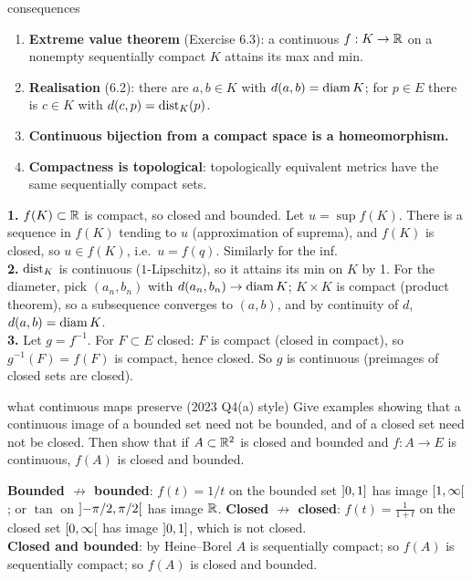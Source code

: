 \begin{thm}{consequences}
\begin{enumerate}
\item \textbf{Extreme value theorem} (Exercise 6.3): a continuous $f:K\to\mathbb R$ on a nonempty
  sequentially compact $K$ attains its max and min.
\item \textbf{Realisation} (6.2): there are $a,b\in K$ with $d(a,b)=\operatorname{diam} K$; for $p\in E$
  there is $c\in K$ with $d(c,p)=\operatorname{dist}_K(p)$.
\item \textbf{Continuous bijection from a compact space is a homeomorphism.}
\item \textbf{Compactness is topological}: topologically equivalent metrics have the same
  sequentially compact sets.
\end{enumerate}
\end{thm}
\begin{answer}
\textbf{1.} $f(K)\subset\mathbb R$ is compact, so closed and bounded. Let $u=\sup f(K)$. There is a
sequence in $f(K)$ tending to $u$ (approximation of suprema), and $f(K)$ is closed, so
$u\in f(K)$, i.e.\ $u=f(q)$. Similarly for the inf.\\
\textbf{2.} $\operatorname{dist}_K$ is continuous ($1$-Lipschitz), so it attains its min on $K$ by 1. For the
diameter, pick $(a_n,b_n)$ with $d(a_n,b_n)\to\operatorname{diam} K$; $K\times K$ is compact (product theorem),
so a subsequence converges to $(a,b)$, and by continuity of $d$, $d(a,b)=\operatorname{diam} K$.\\
\textbf{3.} Let $g=f^{-1}$. For $F\subset E$ closed: $F$ is compact (closed in compact), so
$g^{-1}(F)=f(F)$ is compact, hence closed. So $g$ is continuous (preimages of closed sets are
closed).
\end{answer}

\begin{exam}{what continuous maps preserve (2023 Q4(a) style)}
Give examples showing that a continuous image of a bounded set need not be bounded, and of a
closed set need not be closed. Then show that if $A\subset\mathbb R^2$ is closed and bounded and
$f:A\to E$ is continuous, $f(A)$ is closed and bounded.
\end{exam}
\begin{answer}
\textbf{Bounded $\not\to$ bounded}: $f(t)=1/t$ on the bounded set $\mathopen{]}0,1\mathclose{]}$ has image
$\mathopen{[}1,\infty\mathclose{[}$; or $\tan$ on $\mathopen{]}-\pi/2,\pi/2\mathclose{[}$ has image $\mathbb R$.
\textbf{Closed $\not\to$ closed}: $f(t)=\frac1{1+t}$ on the closed set $\mathopen{[}0,\infty\mathclose{[}$ has image
$\mathopen{]}0,1\mathclose{]}$, which is not closed.\\
\textbf{Closed and bounded}: by Heine--Borel $A$ is sequentially compact; so $f(A)$ is
sequentially compact; so $f(A)$ is closed and bounded.
\end{answer}

